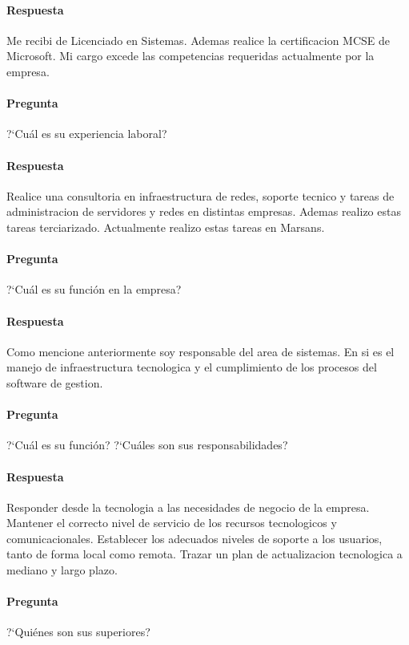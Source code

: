 \documentclass[12pt,a4paper,spanish]{article}
\begin{document}
	\paragraph{Respuesta}
	Me recibi de Licenciado en Sistemas. Ademas realice la certificacion 	MCSE de Microsoft.
	Mi cargo excede las competencias requeridas actualmente por la empresa.
	\paragraph{Pregunta}
	 ?`Cu\'al es su experiencia laboral?
	\paragraph{Respuesta}
	Realice una consultoria en infraestructura de redes, soporte tecnico y tareas de administracion de servidores y redes en distintas empresas.
	Ademas realizo estas tareas terciarizado.
	Actualmente realizo estas tareas en Marsans.

	\paragraph{Pregunta}
	 ?`Cu\'al es su funci\'on en la empresa?
	\paragraph{Respuesta}
	Como mencione anteriormente soy responsable del area de sistemas. En si es el manejo de infraestructura tecnologica y el cumplimiento de los procesos del software de gestion.

	\paragraph{Pregunta}
	 ?`Cu\'al es su funci\'on?  ?`Cu\'ales son sus responsabilidades?
	\paragraph{Respuesta}
Responder desde la tecnologia a las necesidades de negocio de la empresa.
Mantener el correcto nivel de servicio de los recursos tecnologicos y comunicacionales.
Establecer los adecuados niveles de soporte a los usuarios, tanto de forma local como remota.
Trazar un plan de actualizacion tecnologica a mediano y largo plazo.
	
	\paragraph{Pregunta}
	 ?`Qui\'enes son sus superiores? 
\end{document}
